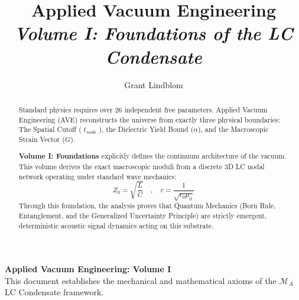 \title{\textbf{Applied Vacuum Engineering} \\ \large \textit{Volume I: Foundations of the LC Condensate}}
\author{Grant Lindblom}
\date{}

\maketitle

\vfill
\noindent\textbf{Applied Vacuum Engineering: Volume I} \\
This document establishes the mechanical and mathematical axioms of the $\mathcal{M}_A$ LC Condensate framework. 

\begin{abstract}
    Standard physics requires over 26 independent free parameters. Applied Vacuum Engineering (AVE) reconstructs the universe from exactly three physical boundaries: The Spatial Cutoff ($\ell_{node}$), the Dielectric Yield Bound ($\alpha$), and the Macroscopic Strain Vector ($G$).
    
    \textbf{Volume I: Foundations} explicitly defines the continuum architecture of the vacuum. This volume derives the exact macroscopic moduli from a discrete 3D LC nodal network operating under standard wave mechanics:
    \begin{equation}
        Z_0 = \sqrt{\frac{L}{C}} \quad , \quad c = \frac{1}{\sqrt{\epsilon_0 \mu_0}}
    \end{equation}
    Through this foundation, the analysis proves that Quantum Mechanics (Born Rule, Entanglement, and the Generalized Uncertainty Principle) are strictly emergent, deterministic acoustic signal dynamics acting on this substrate.
\end{abstract}
